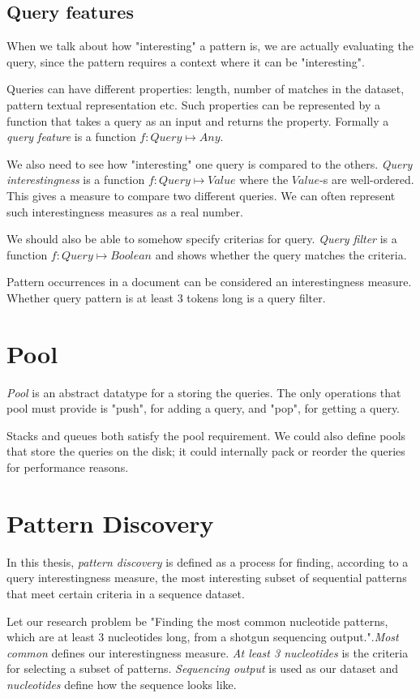 \subsection{Query features}

When we talk about how "interesting" a pattern is, we are actually evaluating the query, since the pattern requires a context where it can be "interesting".

Queries can have different properties: length, number of matches in the dataset, pattern textual representation etc. Such properties can be represented by a function that takes a query as an input and returns the property. Formally a \emph{query feature} is a function $f: Query \mapsto Any$.

We also need to see how "interesting" one query is compared to the others. \emph{Query interestingness} is a function $f: Query \mapsto Value$ where the $Value$-s are well-ordered. This gives a measure to compare two different queries. We can often represent such interestingness measures as a real number.

We should also be able to somehow specify criterias for query. \emph{Query filter} is a function $f: Query \mapsto Boolean$ and shows whether the query matches the criteria.

\begin{exmp}
Pattern occurrences in a document can be considered an interestingness measure. Whether query pattern is at least 3 tokens long is a query filter.
\end{exmp}

\section{Pool}

\emph{Pool} is an abstract datatype for a storing the queries. The only operations that pool must provide is "push", for adding a query, and "pop", for getting a query.

\begin{exmp}
Stacks and queues both satisfy the pool requirement. We could also define pools that store the queries on the disk; it could internally pack or reorder the queries for performance reasons.
\end{exmp}

\section{Pattern Discovery}

In this thesis, \emph{pattern discovery} is defined as a process for finding, according to a query interestingness measure, the most interesting subset of sequential patterns that meet certain criteria in a sequence dataset.

\begin{exmp}
Let our research problem be "Finding the most common nucleotide patterns, which are at least 3 nucleotides long, from a shotgun sequencing output.".\emph{Most common} defines our interestingness measure. \emph{At least 3 nucleotides} is the criteria for selecting a subset of patterns. \emph{Sequencing output} is used as our dataset and \emph{nucleotides} define how the sequence looks like.
\end{exmp}